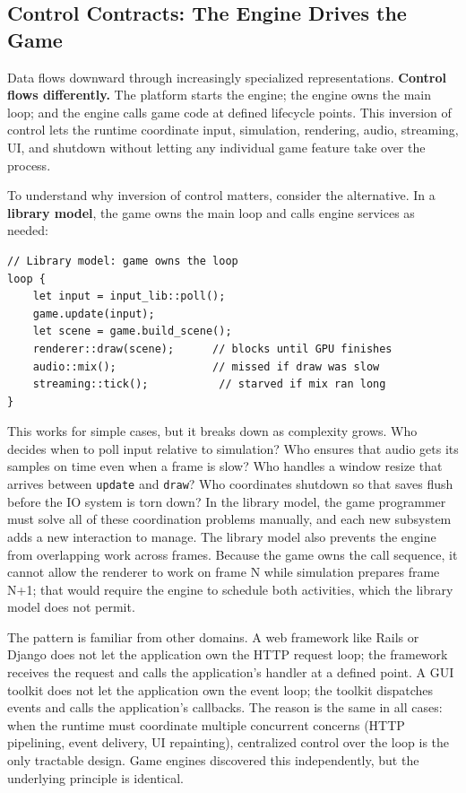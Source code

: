\documentclass[
  11pt,
  letterpaper,
  DIV=11,
  numbers=noendperiod,
  twoside,
  open=right]{scrreprt}
\begin{document}
\subsection{Control Contracts: The Engine Drives the
Game}\label{control-contracts-the-engine-drives-the-game}

Data flows downward through increasingly specialized representations.
\textbf{Control flows differently.} The platform starts the engine; the
engine owns the main loop; and the engine calls game code at defined
lifecycle points. This inversion of control lets the runtime coordinate
input, simulation, rendering, audio, streaming, UI, and shutdown without
letting any individual game feature take over the process.

To understand why inversion of control matters, consider the
alternative. In a \textbf{library model}, the game owns the main loop
and calls engine services as needed:

\begin{verbatim}
// Library model: game owns the loop
loop {
    let input = input_lib::poll();
    game.update(input);
    let scene = game.build_scene();
    renderer::draw(scene);      // blocks until GPU finishes
    audio::mix();               // missed if draw was slow
    streaming::tick();           // starved if mix ran long
}
\end{verbatim}

This works for simple cases, but it breaks down as complexity grows. Who
decides when to poll input relative to simulation? Who ensures that
audio gets its samples on time even when a frame is slow? Who handles a
window resize that arrives between \texttt{update} and \texttt{draw}?
Who coordinates shutdown so that saves flush before the IO system is
torn down? In the library model, the game programmer must solve all of
these coordination problems manually, and each new subsystem adds a new
interaction to manage. The library model also prevents the engine from
overlapping work across frames. Because the game owns the call sequence,
it cannot allow the renderer to work on frame N while simulation
prepares frame N+1; that would require the engine to schedule both
activities, which the library model does not permit.

The pattern is familiar from other domains. A web framework like Rails
or Django does not let the application own the HTTP request loop; the
framework receives the request and calls the application's handler at a
defined point. A GUI toolkit does not let the application own the event
loop; the toolkit dispatches events and calls the application's
callbacks. The reason is the same in all cases: when the runtime must
coordinate multiple concurrent concerns (HTTP pipelining, event
delivery, UI repainting), centralized control over the loop is the only
tractable design. Game engines discovered this independently, but the
underlying principle is identical.
\end{document}
